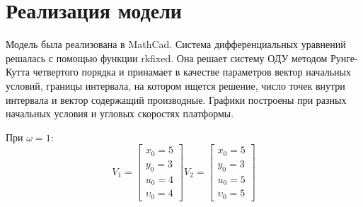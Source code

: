 \documentclass[a4paper, 14pt]{extarticle}
\begin{document}
	\section{Реализация модели}
		Модель была реализована в MathCad. Система дифференциальных уравнений решалась с помощью функции rkfixed.
		Она решает систему ОДУ методом Рунге-Кутта четвертого порядка и принамает в качестве параметров вектор начальных условий, границы интервала, на котором ищется решение, число точек внутри интервала и вектор содержащий производные.
		Графики построены при разных начальных условия и угловых скоростях платформы.
		
		При $\omega = 1$:
		\[
			V_1 = \begin{bmatrix}x_0=5\\y_0=3\\u_0=4\\\upsilon_0=4\end{bmatrix}
			V_2 = \begin{bmatrix}x_0=5\\y_0=3\\u_0=5\\\upsilon_0=5\end{bmatrix}
		\]
		
\end{document}
